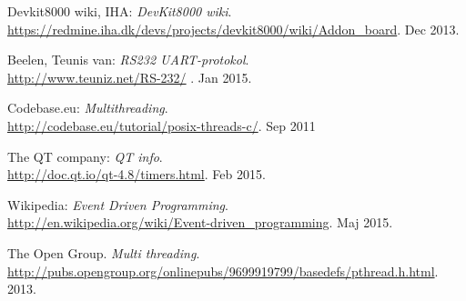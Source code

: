 \begin{thebibliography}{2}
 Devkit8000 wiki, IHA: \textit{DevKit8000 wiki}. \\
\url{https://redmine.iha.dk/devs/projects/devkit8000/wiki/Addon_board}. Dec 2013.

 Beelen, Teunis van: \textit{RS232 UART-protokol}. \\
\url{http://www.teuniz.net/RS-232/} . Jan 2015.

 Codebase.eu: \textit{Multithreading}. \\
\url{http://codebase.eu/tutorial/posix-threads-c/}. Sep 2011

 The QT company: \textit{QT info}. \\
\url{http://doc.qt.io/qt-4.8/timers.html}. Feb 2015.

 Wikipedia: \textit{Event Driven Programming}. \\
\url{http://en.wikipedia.org/wiki/Event-driven_programming}. Maj 2015.

 The Open Group. \textit{Multi threading}. \\
\url{http://pubs.opengroup.org/onlinepubs/9699919799/basedefs/pthread.h.html}. 2013.

\end{thebibliography}